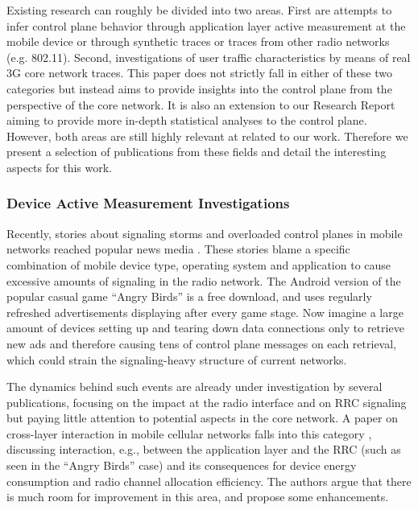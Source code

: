 Existing research can roughly be divided into two areas. First are attempts to infer control plane behavior through application layer active measurement at the mobile device or through synthetic traces or traces from other radio networks (e.g. 802.11).
Second, investigations of user traffic characteristics by means of real 3G core network traces.
This paper does not strictly fall in either of these two categories but instead aims to provide insights into the control plane from the perspective of the core network. It is also an extension to our Research Report\cite{metzger2012research} aiming to provide more in-depth statistical analyses to the control plane.  
However, both areas are still highly relevant at related to our work. Therefore we present a selection of publications from these fields and detail the interesting aspects for this work.

\subsubsection{Device Active Measurement Investigations}

Recently, stories about signaling storms and overloaded control planes in mobile networks reached popular news media \cite{it2011birdandroid, lt2012docostorm}. These stories blame a specific combination of mobile device type, operating system and application to cause excessive amounts of signaling in the radio network. The Android version of the popular casual game ``Angry Birds'' is a free download, and uses regularly refreshed advertisements displaying after every game stage. Now imagine a large amount of devices setting up and tearing down data connections only to retrieve new ads and therefore causing tens of control plane messages on each retrieval, which could strain the signaling-heavy structure of current networks. 

The dynamics behind such events are already under investigation by several publications, focusing on the impact at the radio interface and on \gls{RRC} signaling but paying little attention to potential aspects in the core network. A paper on cross-layer interaction in mobile cellular networks falls into this category \cite{qian2011profiling}, discussing interaction, e.g., between the application layer and the \gls{RRC} (such as seen in the ``Angry Birds'' case) and its consequences for device energy consumption and radio channel allocation efficiency. The authors argue that there is much room for improvement in this area, and propose some enhancements.


